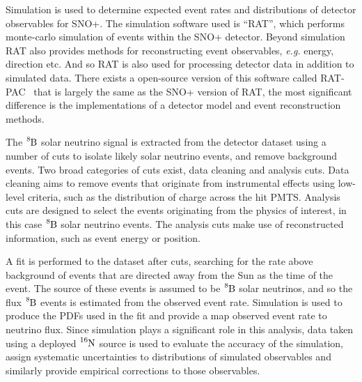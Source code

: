 Simulation is used to determine expected event rates and distributions of
detector observables for SNO+.
The simulation software used is ``RAT'', which performs monte-carlo
simulation of events within the SNO+ detector.
Beyond simulation RAT also provides methods for reconstructing event
observables, \textit{e.g.} energy, direction etc.
And so RAT is also used for processing detector data in addition
to simulated data.
There exists a open-source version of this software called
RAT-PAC~\cite{ratpac} that is largely the same as the SNO+ version of RAT,
the most significant difference is the implementations of a detector model
and event reconstruction methods.

The $\ce{^{8}B}$ solar neutrino signal is extracted from the detector dataset
using a number of cuts to isolate likely solar neutrino events, and remove
background events.
Two broad categories of cuts exist, data cleaning and analysis cuts.
Data cleaning aims to remove events that originate from instrumental effects using
low-level criteria, such as the distribution of charge across the hit PMTS\@.
Analysis cuts are designed to select the events originating from the physics of
interest, in this case $\ce{^{8}B}$ solar neutrino events.
The analysis cuts make use of reconstructed information, such as event energy
or position.

A fit is performed to the dataset after cuts, searching for the rate above background of events
that are directed away from the Sun as the time of the event.
The source of these events is assumed to be $\ce{^{8}B}$ solar neutrinos, and
so the flux $\ce{^{8}B}$ events is estimated from the observed event rate.
Simulation is used to produce the PDFs used in the fit and provide a map observed
event rate to neutrino flux.
Since simulation plays a significant role in this analysis, data taken using
a deployed $\ce{^{16}N}$ source is used to evaluate the accuracy of the
simulation, assign systematic uncertainties to distributions of simulated observables
and similarly provide empirical corrections to those observables.








